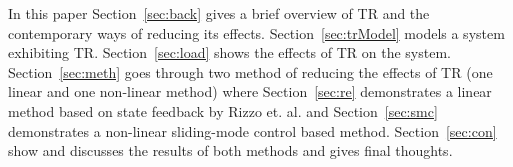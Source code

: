 In this paper 
Section~\ref{sec:back} gives a brief overview of TR and the contemporary ways of reducing its effects.
Section~\ref{sec:trModel} models a system exhibiting TR. 
Section~\ref{sec:load} shows the effects of TR on the system.
Section~\ref{sec:meth} goes through two method of reducing the effects of TR (one linear and one non-linear method) where
Section~\ref{sec:re} demonstrates a linear method based on state feedback by Rizzo et. al. and
Section~\ref{sec:smc} demonstrates a non-linear sliding-mode control based method.
Section~\ref{sec:con} show and discusses the results of both methods and gives final thoughts.


